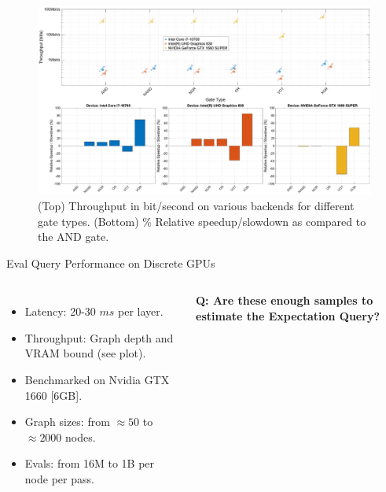 \begin{figure}[hb]
    \centering
    \includegraphics[height=0.8\textheight]{execution_model/slides_throughput_by_gate_type.eps}
    \caption{(Top) Throughput in bit/second on various backends for different gate types. (Bottom) \% Relative speedup/slowdown as compared to the AND gate.}
    \label{fig:gate_throughput}
\end{figure}

\begin{frame}{Eval Query Performance on Discrete GPUs}
  \begin{columns}
    {
      \begin{itemize}
          \item {Latency: 20-30 $ms$ per layer.}
          \item {Throughput: Graph depth and VRAM bound (see plot).}
          \item {Benchmarked on Nvidia GTX 1660 [6GB].}
          \item {Graph sizes: from $\approx 50$ to $\approx 2000$ nodes.}
          \item {Evals: from 16M to 1B per node per pass.}
      \end{itemize}
      \vspace{10pt}
      \textbf{Q: Are these enough samples to estimate the Expectation Query?}
    }
        \centering
        
  \end{columns}
\end{frame}



